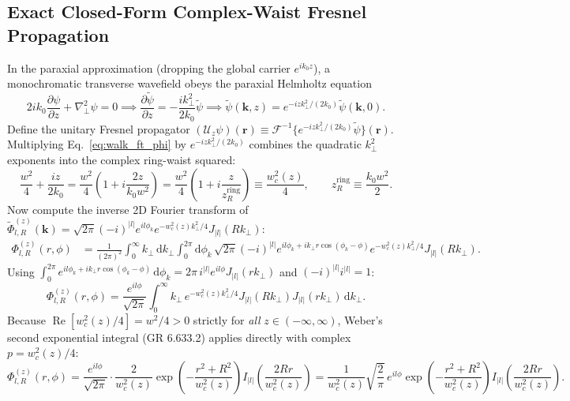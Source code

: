 \documentclass[10pt,letterpaper]{article}
\newcommand{\abs}[1]{\lvert #1 \rvert}
\newcommand{\dd}{\mathrm{d}}
\numberwithin{equation}{section}
\begin{document}
\subsection{Exact Closed-Form Complex-Waist Fresnel Propagation}
In the paraxial approximation (dropping the global carrier $e^{ik_0 z}$), a monochromatic transverse wavefield obeys the paraxial Helmholtz equation
\begin{equation}
  2ik_0\frac{\partial\psi}{\partial z} + \nabla_\perp^2\psi = 0 \implies \frac{\partial\widetilde{\psi}}{\partial z} = -\frac{i k_\perp^2}{2k_0}\widetilde{\psi} \implies \widetilde{\psi}(\mathbf{k}, z) = e^{-i z k_\perp^2/(2k_0)}\widetilde{\psi}(\mathbf{k}, 0).
  \label{eq:walk_fresnel_prop}
\end{equation}
Define the unitary Fresnel propagator $(\mathcal{U}_z\psi)(\mathbf{r}) \equiv \mathcal{F}^{-1}\{e^{-iz k_\perp^2/(2k_0)}\widetilde{\psi}\}(\mathbf{r})$. Multiplying Eq.~\eqref{eq:walk_ft_phi} by $e^{-iz k_\perp^2/(2k_0)}$ combines the quadratic $k_\perp^2$ exponents into the complex ring-waist squared:
\begin{equation}
  \frac{w^2}{4} + \frac{iz}{2k_0} = \frac{w^2}{4}\left(1 + i\frac{2z}{k_0 w^2}\right) = \frac{w^2}{4}\left(1 + i\frac{z}{z_R^{\mathrm{ring}}}\right) \equiv \frac{w_c^2(z)}{4}, \qquad z_R^{\mathrm{ring}} \equiv \frac{k_0 w^2}{2}.
\end{equation}
Now compute the inverse 2D Fourier transform of $\widetilde{\Phi}_{l,R}^{(z)}(\mathbf{k}) = \sqrt{2\pi}(-i)^{\abs{l}} e^{il\phi_k} e^{-w_c^2(z) k_\perp^2/4} J_{\abs{l}}(Rk_\perp)$:
\begin{align}
  \Phi_{l,R}^{(z)}(r,\phi) &= \frac{1}{(2\pi)^2}\int_0^\infty k_\perp\,\dd k_\perp \int_0^{2\pi} \dd\phi_k\, \sqrt{2\pi}(-i)^{\abs{l}} e^{il\phi_k + i k_\perp r\cos(\phi_k-\phi)} e^{-w_c^2(z)k_\perp^2/4} J_{\abs{l}}(R k_\perp).
\end{align}
Using $\int_0^{2\pi} e^{il\phi_k + ik_\perp r\cos(\phi_k-\phi)}\,\dd\phi_k = 2\pi\,i^{\abs{l}} e^{il\phi} J_{\abs{l}}(r k_\perp)$ and $(-i)^{\abs{l}} i^{\abs{l}} = 1$:
\begin{equation}
  \Phi_{l,R}^{(z)}(r,\phi) = \frac{e^{il\phi}}{\sqrt{2\pi}} \int_0^\infty k_\perp\, e^{-w_c^2(z) k_\perp^2/4} J_{\abs{l}}(R k_\perp) J_{\abs{l}}(r k_\perp)\,\dd k_\perp.
\end{equation}
Because $\operatorname{Re}[w_c^2(z)/4] = w^2/4 > 0$ strictly for \emph{all} $z \in (-\infty,\infty)$, Weber's second exponential integral (GR 6.633.2) applies directly with complex $p = w_c^2(z)/4$:
\begin{equation}
  \Phi_{l,R}^{(z)}(r,\phi) = \frac{e^{il\phi}}{\sqrt{2\pi}} \cdot \frac{2}{w_c^2(z)} \exp\!\left(-\frac{r^2+R^2}{w_c^2(z)}\right) I_{\abs{l}}\!\left(\frac{2Rr}{w_c^2(z)}\right) = \frac{1}{w_c^2(z)}\sqrt{\frac{2}{\pi}}\,e^{il\phi}\exp\!\left(-\frac{r^2+R^2}{w_c^2(z)}\right) I_{\abs{l}}\!\left(\frac{2Rr}{w_c^2(z)}\right).
  \label{eq:walk_phi_z}
\end{equation}
\end{document}
